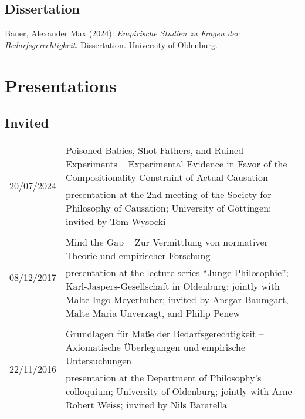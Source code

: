 \documentclass[a4paper,10pt]{article}
\newenvironment{literature}{%
   \parskip6pt\parindent0pt\raggedright
   \def\lititem{\hangindent=1cm\hangafter1}}{%
   \par\ignorespaces}
\begin{document}
\subsection*{Dissertation}
\begin{literature}
\lititem Bauer, Alexander Max (2024): \textit{Empirische Studien zu Fragen der Bedarfsgerechtigkeit}. Dissertation. University of Oldenburg.
\end{literature}


\clearpage
\section{Presentations}
\subsection*{Invited}
\begin{longtable}{p{}p{11cm}}
\multirow{2}{2,25cm}{\footnotesize{20/07/2024}} & Poisoned Babies, Shot Fathers, and Ruined Experiments -- Experimental Evidence in Favor of the Compositionality Constraint of Actual Causation\\
& \footnotesize{presentation at the 2nd meeting of the Society for Philosophy of Causation; University of Göttingen; invited by Tom Wysocki}\\
\\
\multirow{2}{2,25cm}{\footnotesize{08/12/2017}} & Mind the Gap -- Zur Vermittlung von normativer Theorie und empirischer Forschung\\
& \footnotesize{presentation at the lecture series \enquote{Junge Philosophie}; Karl-Jaspers-Gesellschaft in Oldenburg; jointly with Malte Ingo Meyerhuber; invited by Ansgar Baumgart, Malte Maria Unverzagt, and Philip Penew}\\
\\
\multirow{2}{2,25cm}{\footnotesize{22/11/2016}} & Grundlagen für Maße der Bedarfsgerechtigkeit -- Axiomatische Überlegungen und empirische Untersuchungen\\
& \footnotesize{presentation at the Department of Philosophy's colloquium; University of Oldenburg; jointly with Arne Robert Weiss; invited by Nils Baratella}\\
\end{longtable}
\end{document}
